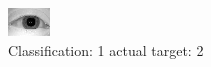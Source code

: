 \begin{figure}[h!]
\begin{center}
\includegraphics[width=0.60\columnwidth]{figures/ID901_class_1_target_2.png}
\end{center}
\caption{ Classification: 1 actual target: 2}
\label{fig:ID901_class_1_target_2}
\end{figure}
